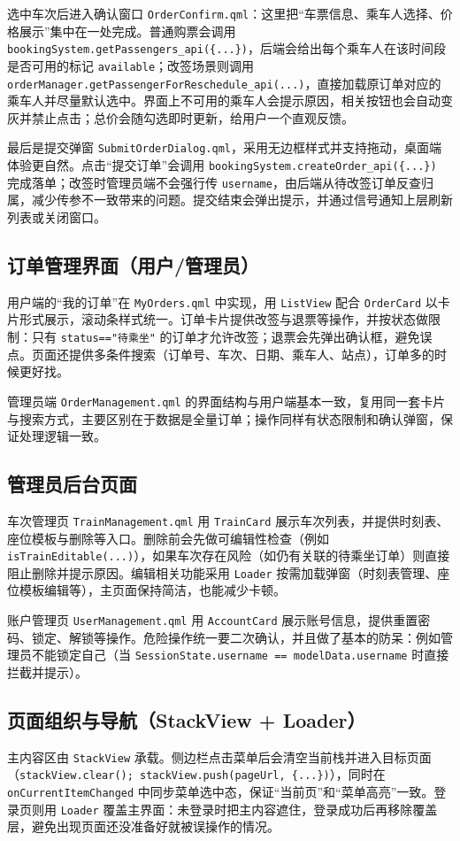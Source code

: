 \documentclass{article}
\begin{document}
		选中车次后进入确认窗口 \texttt{OrderConfirm.qml}：这里把“车票信息、乘车人选择、价格展示”集中在一处完成。普通购票会调用 \texttt{bookingSystem.getPassengers\_api(\{...\})}，后端会给出每个乘车人在该时间段是否可用的标记 \texttt{available}；改签场景则调用 \texttt{orderManager.getPassengerForReschedule\_api(...)}，直接加载原订单对应的乘车人并尽量默认选中。界面上不可用的乘车人会提示原因，相关按钮也会自动变灰并禁止点击；总价会随勾选即时更新，给用户一个直观反馈。
		
		最后是提交弹窗 \texttt{SubmitOrderDialog.qml}，采用无边框样式并支持拖动，桌面端体验更自然。点击“提交订单”会调用 \texttt{bookingSystem.createOrder\_api(\{...\})} 完成落单；改签时管理员端不会强行传 \texttt{username}，由后端从待改签订单反查归属，减少传参不一致带来的问题。提交结束会弹出提示，并通过信号通知上层刷新列表或关闭窗口。
		
		\subsection{订单管理界面（用户/管理员）}
		用户端的“我的订单”在 \texttt{MyOrders.qml} 中实现，用 \texttt{ListView} 配合 \texttt{OrderCard} 以卡片形式展示，滚动条样式统一。订单卡片提供改签与退票等操作，并按状态做限制：只有 \texttt{status=="待乘坐"} 的订单才允许改签；退票会先弹出确认框，避免误点。页面还提供多条件搜索（订单号、车次、日期、乘车人、站点），订单多的时候更好找。
		
		管理员端 \texttt{OrderManagement.qml} 的界面结构与用户端基本一致，复用同一套卡片与搜索方式，主要区别在于数据是全量订单；操作同样有状态限制和确认弹窗，保证处理逻辑一致。
		
		\subsection{管理员后台页面}
		车次管理页 \texttt{TrainManagement.qml} 用 \texttt{TrainCard} 展示车次列表，并提供时刻表、座位模板与删除等入口。删除前会先做可编辑性检查（例如 \texttt{isTrainEditable(...)}），如果车次存在风险（如仍有关联的待乘坐订单）则直接阻止删除并提示原因。编辑相关功能采用 \texttt{Loader} 按需加载弹窗（时刻表管理、座位模板编辑等），主页面保持简洁，也能减少卡顿。
		
		账户管理页 \texttt{UserManagement.qml} 用 \texttt{AccountCard} 展示账号信息，提供重置密码、锁定、解锁等操作。危险操作统一要二次确认，并且做了基本的防呆：例如管理员不能锁定自己（当 \texttt{SessionState.username == modelData.username} 时直接拦截并提示）。
		
		\subsection{页面组织与导航（StackView + Loader）}
		主内容区由 \texttt{StackView} 承载。侧边栏点击菜单后会清空当前栈并进入目标页面（\texttt{stackView.clear(); stackView.push(pageUrl, \{...\})}），同时在 \texttt{onCurrentItemChanged} 中同步菜单选中态，保证“当前页”和“菜单高亮”一致。登录页则用 \texttt{Loader} 覆盖主界面：未登录时把主内容遮住，登录成功后再移除覆盖层，避免出现页面还没准备好就被误操作的情况。
		
\end{document}
